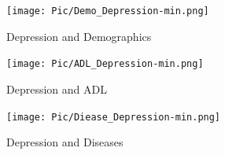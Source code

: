 \documentclass[12pt]{article}
\begin{document}
\begin{figure}[htbp]
\centering
\texttt{[image: Pic/Demo\_Depression-min.png]}
\caption{Depression and Demographics}\label{Demo_Depression_Clear}
\end{figure}

\clearpage
\begin{figure}[htbp]
\centering
\texttt{[image: Pic/ADL\_Depression-min.png]}
\caption{Depression and ADL}\label{ADL_Depression_Clear}
\end{figure}

\begin{figure}[htbp]
\centering
\texttt{[image: Pic/Diease\_Depression-min.png]}
\caption{Depression and Diseases}\label{Diease_Depression_Clear}
\end{figure} 
\end{document}
